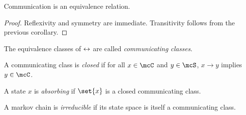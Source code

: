 \begin{corollary}
    Communication is an equivalence relation.
\end{corollary}
\begin{proof}
    Reflexivity and symmetry are immediate.
    Transitivity follows from the previous corollary.
\end{proof}

\begin{definition*} \label{def:comm_class}
    The equivalence classes of $\leftrightarrow$ are called
    \emph{communicating classes}.

    A communicating class \mcC{} is \emph{closed} if for all $x \in \mcC$
    and $y \in \mcS$, $x \to y$ implies $y \in \mcC$.

    A state $x$ is \emph{absorbing} if $\set{x}$ is a closed
    communicating class.

    A markov chain is \emph{irreducible} if its state space is itself
    a communicating class.
\end{definition*}

